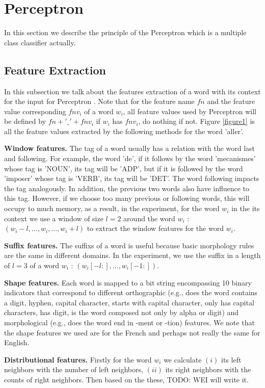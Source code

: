 \documentclass{article}
\begin{document}
\section{Perceptron}
In this section we describe the principle of the Perceptron which is a multiple class classifier actually.

\subsection{Feature Extraction}
In this subsection we talk about the features extraction of a word with its context for the input for Perceptron \cite{schnabel2014flors}. Note that for the feature name $fn$ and  the feature value corresponding $fnv_i$ of a word $w_i$, all feature values used by Perceptron will be defined by $fn + '\_' + fnv_i$ if $w_i$ has $fnv_i$, do nothing if not. Figure \ref{figure1} is all the feature values extracted by the following methods for the word 'aller'.

\textbf{Window features.} The tag of a word usually has a relation with the word last and following. For example, the word 'de', if it follows by the word 'mecanismes' whose tag is 'NOUN', its tag will be 'ADP', but if it is followed by the word 'imposer' whose tag is 'VERB', its tag will be 'DET'. The word following impacts the tag analogously. In addition, the previous two words also have influence to this tag. However, if we choose too many previous or following words, this will occupy to much memory, as a result, in the experiment, for the word $w_i$ in the its context we use a window of size $l = 2$ around the word $w_i$ : $(w_i-l,\dots, w_i,\dots, w_i+l )$ to extract the window features for the word $w_i$.

\textbf{Suffix features.} The suffixs of a word is useful because basic morphology rules are the same in different domains. In the experiment, we use the suffix in a length of $l = 3$ of a word $w_i$ : $(w_i[-l:],\dots,w_i[-1:])$. 

\textbf{Shape features.} Each word is mapped to a bit string encompassing 10 binary indicators that correspond to different orthographic (e.g., does the word contains a digit, hyphen, capital character, starts with capital character, only has capital characters, has digit, is the word composed not only by alpha or digit) and morphological (e.g., does the word end in -ment or -tion) features. We note that the shape features we used are for the French and perhaps not really the same for English. 

\textbf{Distributional features.} Firstly for the word $w_i$ we calculate $(i)$ its left neighbors with the number of left neighbors, $(ii)$ its right neighbors with the counts of right neighbors. Then based on the these, TODO: WEI will write it.
\end{document}
